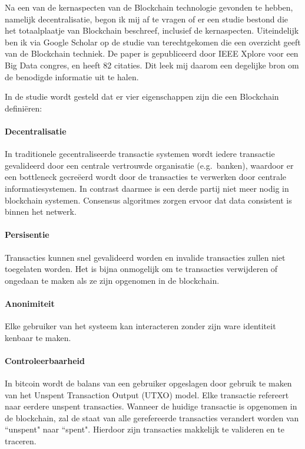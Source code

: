 Na een van de kernaspecten van de Blockchain technologie gevonden te hebben, namelijk decentralisatie, begon ik mij af te vragen of er een studie bestond die het totaalplaatje van Blockchain beschreef, inclusief de kernaspecten. Uiteindelijk ben ik via Google Scholar op de studie van \cite{zheng2017overview} terechtgekomen die een overzicht geeft van de Blockchain techniek. De paper is gepubliceerd door IEEE Xplore voor een Big Data congres, en heeft 82 citaties. Dit leek mij daarom een degelijke bron om de benodigde informatie uit te halen.

\clearpage
In de studie wordt gesteld dat er vier eigenschappen zijn die een Blockchain definiëren:

\paragraph{Decentralisatie} In traditionele gecentraliseerde transactie systemen wordt iedere transactie gevalideerd door een centrale vertrouwde organisatie (e.g.\ banken), waardoor er een bottleneck gecreëerd wordt door de transacties te verwerken door centrale informatiesystemen. In contrast daarmee is een derde partij niet meer nodig in blockchain systemen. Consensus algoritmes zorgen ervoor dat data consistent is binnen het netwerk.

\paragraph{Persisentie} Transacties kunnen snel gevalideerd worden en invalide transacties zullen niet toegelaten worden. Het is bijna onmogelijk om te transacties verwijderen of ongedaan te maken als ze zijn opgenomen in de blockchain.

\paragraph{Anonimiteit} Elke gebruiker van het systeem kan interacteren zonder zijn ware identiteit kenbaar te maken.

\paragraph{Controleerbaarheid} In bitcoin wordt de balans van een gebruiker opgeslagen door gebruik te maken van het Unspent Transaction Output (UTXO) model. Elke transactie refereert naar eerdere unspent transacties. Wanneer de huidige transactie is opgenomen in de blockchain, zal de staat van alle gerefereerde transacties verandert worden van ``unspent" naar ``spent". Hierdoor zijn transacties makkelijk te valideren en te traceren.

